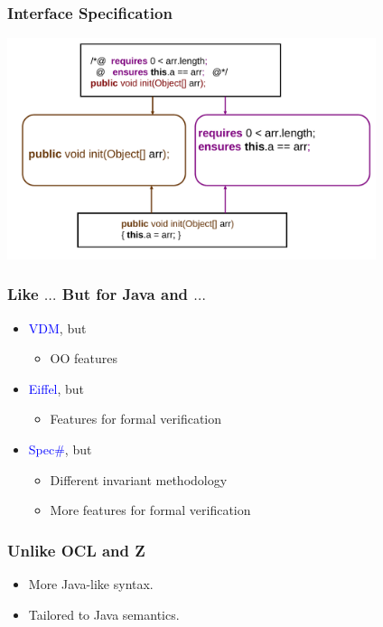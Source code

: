 \begin{frame}
\frametitle{Interface Specification}
\includegraphics[width=4.25in]{if1}
\end{frame}

\begin{frame}
\frametitle{Like $\ldots$ But for Java and $\ldots$}
\begin{itemize}
\item
\textcolor{blue}{VDM}, but
\begin{itemize}
\item
OO features
\end{itemize}

\item
\textcolor{blue}{Eiffel}, but
\begin{itemize}
\item
Features for formal verification
\end{itemize}

\item
\textcolor{blue}{Spec\#}, but
\begin{itemize}
\item
Different invariant methodology
\item
More features for formal verification
\end{itemize}
\end{itemize}
\end{frame}

\begin{frame}
\frametitle{Unlike OCL and Z}

\begin{itemize}
\item
More Java-like syntax.

\item
Tailored to Java semantics.
\end{itemize}
\end{frame}

